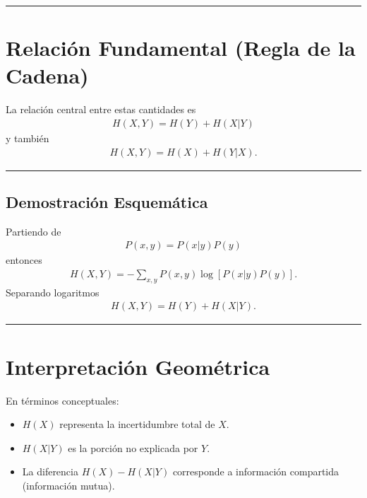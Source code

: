 \documentclass[letterpaper,10pt,english]{jupyterBook}
\begin{document}
\bigskip\hrule\bigskip



\section{Relación Fundamental (Regla de la Cadena)}
\label{\detokenize{01_theory/conditional_entropy:relacion-fundamental-regla-de-la-cadena}}
\sphinxAtStartPar
La relación central entre estas cantidades es
\begin{equation*}
\begin{split}
H(X,Y)=H(Y)+H(X|Y)
\end{split}
\end{equation*}
\sphinxAtStartPar
y también
\begin{equation*}
\begin{split}
H(X,Y)=H(X)+H(Y|X).
\end{split}
\end{equation*}

\bigskip\hrule\bigskip



\subsection{Demostración Esquemática}
\label{\detokenize{01_theory/conditional_entropy:demostracion-esquematica}}
\sphinxAtStartPar
Partiendo de
\begin{equation*}
\begin{split}
P(x,y)=P(x|y)P(y)
\end{split}
\end{equation*}
\sphinxAtStartPar
entonces
\begin{equation*}
\begin{split}
H(X,Y) = -\sum_{x,y} P(x,y)\log[P(x|y)P(y)].
\end{split}
\end{equation*}
\sphinxAtStartPar
Separando logaritmos
\begin{equation*}
\begin{split}
H(X,Y)=H(Y)+H(X|Y).
\end{split}
\end{equation*}

\bigskip\hrule\bigskip



\section{Interpretación Geométrica}
\label{\detokenize{01_theory/conditional_entropy:interpretacion-geometrica}}
\sphinxAtStartPar
En términos conceptuales:
\begin{itemize}
\item {} 
\sphinxAtStartPar
\(H(X)\) representa la incertidumbre total de \(X\).

\item {} 
\sphinxAtStartPar
\(H(X|Y)\) es la porción no explicada por \(Y\).

\item {} 
\sphinxAtStartPar
La diferencia \(H(X)-H(X|Y)\) corresponde a información compartida
(información mutua).

\end{itemize}
\end{document}
